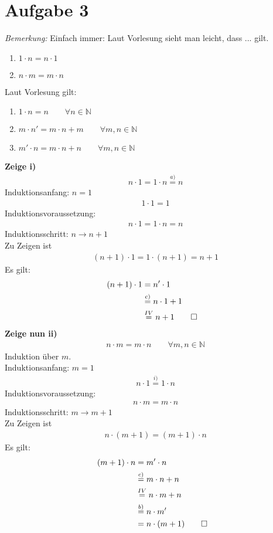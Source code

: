 \section{Aufgabe 3}
\textit{Bemerkung:} Einfach immer: Laut Vorlesung sieht man leicht, dass ... gilt.
\begin{enumerate}[label={\roman*)}]
  \item $1\cdot n = n\cdot 1$
  \item $n\cdot m =m\cdot n$
\end{enumerate}
Laut Vorlesung gilt:
\begin{enumerate}[label={\alph*)}]
  \item $1\cdot n=n \qquad \forall n\in\mathbb{N}$
  \item $m\cdot n'=m\cdot n+m \qquad \forall m,n\in\mathbb{N}$
  \item $m'\cdot n=m\cdot n+n \qquad \forall m,n\in\mathbb{N}$
\end{enumerate}
\textbf{Zeige i)}\begin{align*}&n\cdot 1=1\cdot n\overset{a)}{=}n\end{align*}
Induktionsanfang: $n=1$ \begin{align*}&1\cdot 1=1\end{align*}
Induktionsvoraussetzung: \begin{align*}&n\cdot 1=1\cdot n=n\end{align*}
Induktionsschritt: $n\rightarrow n+1$ \\
Zu Zeigen ist \begin{align*}&(n+1)\cdot 1=1\cdot (n+1)=n+1\end{align*}
Es gilt: \begin{align*}(n+1)\cdot 1&=n'\cdot 1\\ &\overset{c)}{=}n\cdot 1+1\\ &\overset{IV}{=}n+1\qed\end{align*}
\textbf{Zeige nun ii)}\begin{align*}&n\cdot m=m\cdot n\qquad\forall m,n\in\mathbb{N}\end{align*}
Induktion über $m$.\\
Induktionsanfang: $m=1$ \begin{align*}&n\cdot 1\overset{i)}{=}1\cdot n\end{align*}
Induktionsvoraussetzung: \begin{align*}&n\cdot m=m\cdot n\end{align*}
Induktionsschritt: $m\rightarrow m+1$ \\
Zu Zeigen ist \begin{align*}&n\cdot (m+1)=(m+1)\cdot n\end{align*}
Es gilt: \begin{align*}(m+1)\cdot n&=m'\cdot n\\ &\overset{c)}{=}m\cdot n+n\\ &\overset{IV}{=}n\cdot m+n\\ &\overset{b)}{=}n\cdot m'\\ &=n\cdot (m+1)\qed\end{align*}

